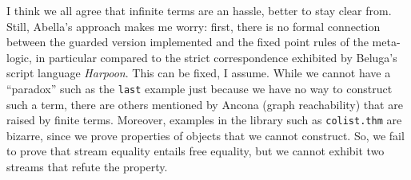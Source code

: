I think we all agree that infinite terms are an hassle, better to stay
clear from. Still, Abella's approach makes me worry: first, there is
no formal connection between the guarded version implemented and the
fixed point rules of the meta-logic, in particular compared to the strict correspondence exhibited by Beluga's script language
\emph{Harpoon}.  This can be fixed, I assume. While we cannot have a
``paradox'' such as the \texttt{last} example just because we have no
way to construct such a term, there are others mentioned by Ancona
(graph reachability) that are raised by finite terms. Moreover,
examples in the library such as \texttt{colist.thm} are bizarre,
since we prove properties of objects that we cannot construct. So, we fail to prove that
stream equality entails free equality,  but we cannot exhibit two streams that
refute the property.

